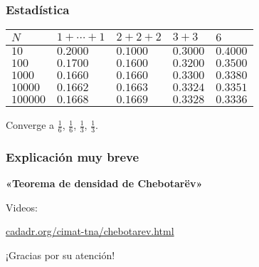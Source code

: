 \documentclass{beamer}
\begin{document}

\begin{frame}[fragile]
  \frametitle{Estadística}

  \begin{center}
    \renewcommand{\arraystretch}{1.5}
    \begin{tabular}{lx{2cm}x{2cm}x{2cm}x{2cm}}
      $N$      & $1+\cdots+1$ & $2+2+2$ & $3+3$ & $6$ \tabularnewline
      \hline
      $10$     & $0.2000$ & $0.1000$ & $0.3000$ & $0.4000$ \tabularnewline
      $100$    & $0.1700$ & $0.1600$ & $0.3200$ & $0.3500$ \tabularnewline
      $1000$   & $0.1660$ & $0.1660$ & $0.3300$ & $0.3380$ \tabularnewline
      $10000$  & $0.1662$ & $0.1663$ & $0.3324$ & $0.3351$ \tabularnewline
      $100000$ & $0.1668$ & $0.1669$ & $0.3328$ & $0.3336$ \tabularnewline
    \end{tabular}
  \end{center}

  Converge a $\frac{1}{6}$, $\frac{1}{6}$, $\frac{1}{3}$, $\frac{1}{3}$.
\end{frame}


\begin{frame}[fragile]
  \frametitle{Explicación muy breve}

  \textbf{«Teorema de densidad de Chebotarëv»}
\end{frame}


\begin{frame}[plain]
  \headingfont

  \begin{center}
    {\large Videos:

      \vspace{2em}

      \href{https://cadadr.org/cimat-tna/chebotarev.html}{cadadr.org/cimat-tna/chebotarev.html}

    }
  \end{center}
\end{frame}


\begin{frame}[plain]
  \headingfont

  \begin{center}
    {\huge ¡Gracias por su atención!}
  \end{center}
\end{frame}
\end{document}
